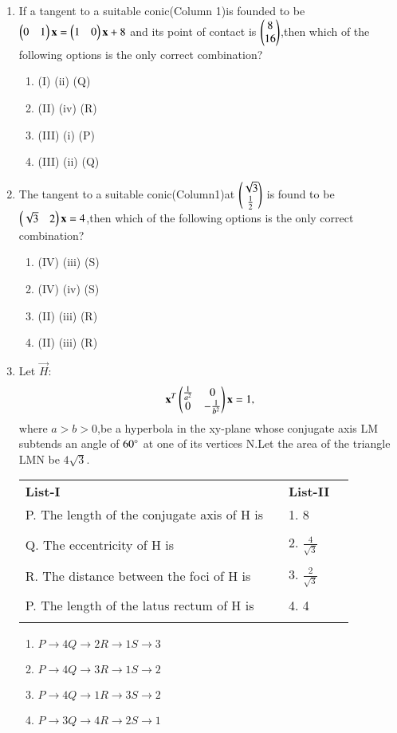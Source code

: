 \begin{enumerate}[label=\arabic*.,ref=\thesubsection.\theenumi]
\begin{enumerate}
    \end{enumerate}
    \item If a tangent to a suitable conic(Column 1)is founded to be $\begin{pmatrix}0&1\end{pmatrix}\mathbf{x}=\begin{pmatrix}1&0\end{pmatrix}\mathbf{x}+8$ and its point of contact is $\begin{pmatrix}8\\16\end{pmatrix}$,then which of the following options is the only correct combination?
    \begin{enumerate}
    \item (I)  (ii)  (Q)
    \item (II)  (iv)  (R)
    \item (III)  (i)  (P)
    \item (III)  (ii)  (Q)
    \end{enumerate}
    \item The tangent to a suitable conic(Column1)at $\begin{pmatrix}\sqrt{3}\\\frac{1}{2}\end{pmatrix}$ is found to be 
    $\begin{pmatrix}\sqrt{3}&2\end{pmatrix}\mathbf{x}=4$,then which of the following options is the only correct combination?
    \begin{enumerate}
    \item (IV)  (iii)  (S)
    \item (IV)  (iv)  (S)
    \item (II)  (iii)  (R) 
    \item (II)  (iii)  (R)
    \end{enumerate}
    \item Let $\vec{H}$:
    \begin{align}
    \mathbf{x}^T\begin{pmatrix}\frac{1}{a^2}&0\\0&-\frac{1}{b^2}\end{pmatrix}\mathbf{x}=1,
    \end{align} where $a>b>0$,be a hyperbola in the xy-plane whose conjugate axis LM subtends an angle of $60\degree$ at one of its vertices N.Let the area of the triangle LMN be $4\sqrt{3}$.
    \begin{tabular}{llll}
    \textbf{List-I} &\enspace &\textbf{List-II}\\
    P. The length of the conjugate axis of H is &\enspace &1. 8\\ &&&\\
    Q. The eccentricity of H is &\enspace &2. $\frac{4}{\sqrt{3}}$\\ &&&\\
    R. The distance between the foci of H is & \enspace & 
    3. $\frac{2}{\sqrt{3}}$\\ &&&\\
    P. The length of the latus rectum of H is&\enspace &   4. 4\\ &&&\\
    \end{tabular}
    \begin{enumerate}
    \item $P\to4 Q\to2 R\to1 S\to3$
    \item $P\to4 Q\to3 R\to1 S\to2$
    \item $P\to4 Q\to1 R\to3 S\to2$
    \item $P\to3 Q\to4 R\to2 S\to1$
    \end{enumerate}
    
    \end{enumerate}
    
